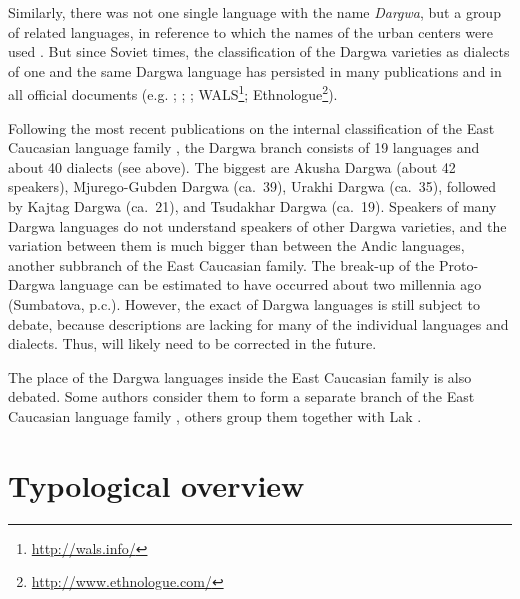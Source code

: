 Similarly, there was not one single language with the name \textit{Dargwa}, but a group of related languages, in reference to which the names of the urban centers were used \citep[1]{Uslar1892}. But since Soviet times, the classification of the Dargwa varieties as dialects of one and the same Dargwa language has persisted in many publications and in all official documents (e.g. ; ; ; WALS\footnote{\url{http://wals.info/}}; Ethnologue\footnote{\url{http://www.ethnologue.com/}}).

Following the most recent publications on the internal classification of the East Caucasian language family \citep{Korjakov2006, Korjakov.Sumbatova2007}, the Dargwa branch consists of 19 languages and about 40 dialects (see  above). The biggest are Akusha Dargwa (about 42 speakers), Mjurego-Gubden Dargwa (ca.~39), Urakhi Dargwa (ca.~35), followed by Kajtag Dargwa (ca.~21), and Tsudakhar Dargwa (ca.~19). Speakers of many Dargwa languages do not understand speakers of other Dargwa varieties, and the variation between them is much bigger than between the Andic languages, another subbranch of the East Caucasian family. The break-up of the Proto-Dargwa language can be estimated to have occurred about two millennia ago (Sumbatova, p.c.). However, the exact  of Dargwa languages is still subject to debate, because descriptions are lacking for many of the individual languages and dialects. Thus,  will likely need to be corrected in the future.

The place of the Dargwa languages inside the East Caucasian family is also debated. Some authors consider them to form a separate branch of the East Caucasian language family \citep[142]{Gigineishvili1977, Kibrik1996}, others group them together with Lak \citep{Haspelmath1993, Korjakov2006, vandenBerg2005}.



\section{Typological overview}
\label{sec:Typological overview}

